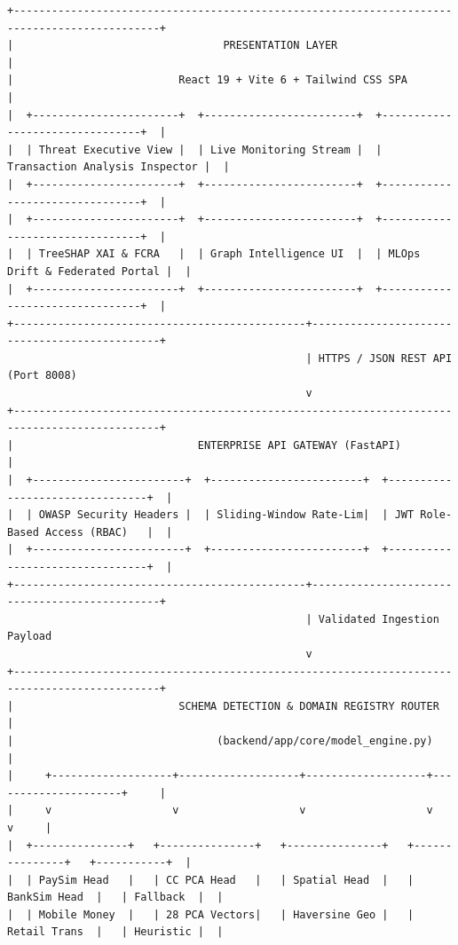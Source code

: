 \documentclass[12pt,a4paper,oneside]{report}
\begin{document}
\begin{lstlisting}
+---------------------------------------------------------------------------------------------+
|                                 PRESENTATION LAYER                                          |
|                          React 19 + Vite 6 + Tailwind CSS SPA                               |
|  +-----------------------+  +------------------------+  +--------------------------------+  |
|  | Threat Executive View |  | Live Monitoring Stream |  | Transaction Analysis Inspector |  |
|  +-----------------------+  +------------------------+  +--------------------------------+  |
|  +-----------------------+  +------------------------+  +--------------------------------+  |
|  | TreeSHAP XAI & FCRA   |  | Graph Intelligence UI  |  | MLOps Drift & Federated Portal |  |
|  +-----------------------+  +------------------------+  +--------------------------------+  |
+----------------------------------------------+----------------------------------------------+
                                               | HTTPS / JSON REST API (Port 8008)
                                               v
+---------------------------------------------------------------------------------------------+
|                             ENTERPRISE API GATEWAY (FastAPI)                                |
|  +------------------------+  +------------------------+  +--------------------------------+  |
|  | OWASP Security Headers |  | Sliding-Window Rate-Lim|  | JWT Role-Based Access (RBAC)   |  |
|  +------------------------+  +------------------------+  +--------------------------------+  |
+----------------------------------------------+----------------------------------------------+
                                               | Validated Ingestion Payload
                                               v
+---------------------------------------------------------------------------------------------+
|                          SCHEMA DETECTION & DOMAIN REGISTRY ROUTER                          |
|                                (backend/app/core/model_engine.py)                           |
|     +-------------------+-------------------+-------------------+---------------------+     |
|     v                   v                   v                   v                     v     |
|  +---------------+   +---------------+   +---------------+   +---------------+   +-----------+  |
|  | PaySim Head   |   | CC PCA Head   |   | Spatial Head  |   | BankSim Head  |   | Fallback  |  |
|  | Mobile Money  |   | 28 PCA Vectors|   | Haversine Geo |   | Retail Trans  |   | Heuristic |  |

\end{lstlisting}
\end{document}
